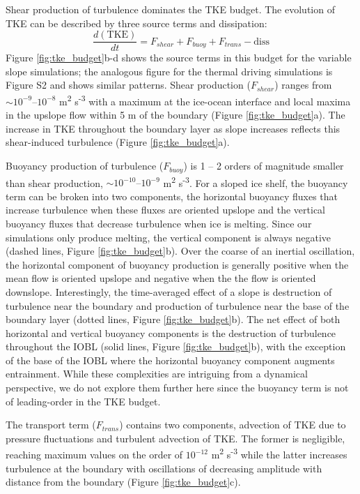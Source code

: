 \documentclass[draft]{agujournal2019}
\begin{document}
Shear production of turbulence dominates the TKE budget. The evolution of TKE can be described by three source terms and dissipation:
\begin{equation}
    \frac{d(\textrm{TKE})}{dt} = F_{shear} + F_{buoy} + F_{trans} - \textrm{diss}
\end{equation}
Figure \ref{fig:tke_budget}b-d shows the source terms in this budget for the variable slope simulations; the analogous figure for the thermal driving simulations is Figure S2 and shows similar patterns. Shear production ($F_{shear}$) ranges from $\sim 10^{-9} \textrm{--} 10^{-8}$ m\textsuperscript{2} s\textsuperscript{-3} with a maximum at the ice-ocean interface and local maxima in the upslope flow within 5 m of the boundary (Figure \ref{fig:tke_budget}a). The increase in TKE throughout the boundary layer as slope increases reflects this shear-induced turbulence (Figure \ref{fig:tke_budget}a).

Buoyancy production of turbulence ($F_{buoy}$) is 1 -- 2 orders of magnitude smaller than shear production, $\sim\!10^{-10} \textrm{--} 10^{-9}$ m\textsuperscript{2} s\textsuperscript{-3}. For a sloped ice shelf, the buoyancy term can be broken into two components, the horizontal buoyancy fluxes that increase turbulence when these fluxes are oriented upslope and the vertical buoyancy fluxes that decrease turbulence when ice is melting. Since our simulations only produce melting, the vertical component is always negative (dashed lines, Figure \ref{fig:tke_budget}b). Over the coarse of an inertial oscillation, the horizontal component of buoyancy production is generally positive when the mean flow is oriented upslope and negative when the the flow is oriented downslope. Interestingly, the time-averaged effect of a slope is destruction of turbulence near the boundary and production of turbulence near the base of the boundary layer (dotted lines, Figure \ref{fig:tke_budget}b). The net effect of both horizontal and vertical buoyancy components is the destruction of turbulence throughout the IOBL (solid lines, Figure \ref{fig:tke_budget}b), with the exception of the base of the IOBL where the horizontal buoyancy component augments entrainment. While these complexities are intriguing from a dynamical perspective, we do not explore them further here since the buoyancy term is not of leading-order in the TKE budget.

The transport term ($F_{trans}$) contains two components, advection of TKE due to pressure fluctuations and turbulent advection of TKE. The former is negligible, reaching maximum values on the order of $10^{-12}$ m\textsuperscript{2} s\textsuperscript{-3} while the latter increases turbulence at the boundary with oscillations of decreasing amplitude with distance from the boundary (Figure \ref{fig:tke_budget}c). 
\end{document}
